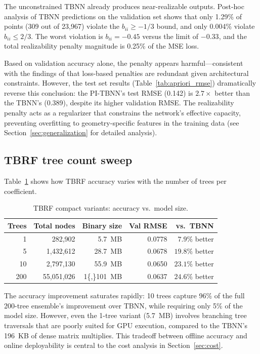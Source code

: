 The unconstrained TBNN already produces near-realizable outputs.
Post-hoc analysis of TBNN predictions on the validation set shows that only 1.29\% of points (309 out of 23{,}967) violate the $b_{ii} \geq -1/3$ bound, and only 0.004\% violate $b_{ii} \leq 2/3$.
The worst violation is $b_{ii} = -0.45$ versus the limit of $-0.33$, and the total realizability penalty magnitude is 0.25\% of the MSE loss.

Based on validation accuracy alone, the penalty appears harmful---consistent with the findings of \citet{Wu2018} that loss-based penalties are redundant given architectural constraints.
However, the test set results (Table~\ref{tab:apriori_rmse}) dramatically reverse this conclusion: the PI-TBNN's test RMSE (0.142) is $2.7\times$ better than the TBNN's (0.389), despite its higher validation RMSE.
The realizability penalty acts as a regularizer that constrains the network's effective capacity, preventing overfitting to geometry-specific features in the training data (see Section~\ref{sec:generalization} for detailed analysis).

\subsection{TBRF tree count sweep}

Table~\ref{tab:tbrf_sweep} shows how TBRF accuracy varies with the number of trees per coefficient.

\begin{table}[htbp]
\centering
\caption{TBRF compact variants: accuracy vs.\ model size.}
\label{tab:tbrf_sweep}
\begin{tabular}{rrrrr}
\toprule
Trees & Total nodes & Binary size & Val RMSE & vs.\ TBNN \\
\midrule
1   & 282{,}902    & \SI{5.7}{MB}   & 0.0778 & $7.9\%$ better \\
5   & 1{,}432{,}612 & \SI{28.7}{MB}  & 0.0678 & $19.8\%$ better \\
10  & 2{,}797{,}130 & \SI{55.9}{MB}  & 0.0650 & $23.1\%$ better \\
200 & 55{,}051{,}026 & \SI{1{,}101}{MB} & 0.0637 & $24.6\%$ better \\
\bottomrule
\end{tabular}
\end{table}

The accuracy improvement saturates rapidly: 10 trees capture 96\% of the full 200-tree ensemble's improvement over TBNN, while requiring only 5\% of the model size.
However, even the 1-tree variant (\SI{5.7}{MB}) involves branching tree traversals that are poorly suited for GPU execution, compared to the TBNN's \SI{196}{KB} of dense matrix multiplies.
This tradeoff between offline accuracy and online deployability is central to the cost analysis in Section~\ref{sec:cost}.
